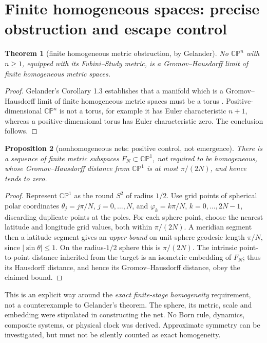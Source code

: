 \documentclass[11pt,a4paper]{article}
\newtheorem{theorem}{Theorem}
\newtheorem{proposition}[theorem]{Proposition}
\newcommand{\CP}{\mathbb{CP}}
\begin{document}
\section{Finite homogeneous spaces: precise obstruction and escape control}
\begin{theorem}[finite homogeneous metric obstruction, by Gelander]\label{thm:gel}
No \(\CP^n\) with \(n\geq1\), equipped with its Fubini--Study metric, is a Gromov--Hausdorff limit of finite \emph{homogeneous metric spaces}.
\end{theorem}
\begin{proof}
Gelander's Corollary 1.3 establishes that a manifold which is a Gromov--Hausdorff limit of finite homogeneous metric spaces must be a torus \cite{gelander}. Positive-dimensional \(\CP^n\) is not a torus, for example it has Euler characteristic \(n+1\), whereas a positive-dimensional torus has Euler characteristic zero. The conclusion follows.
\end{proof}

\begin{proposition}[nonhomogeneous nets: positive control, not emergence]\label{prop:nets}
There is a sequence of finite metric subspaces \(F_N\subset\CP^1\), not required to be homogeneous, whose Gromov--Hausdorff distance from \(\CP^1\) is at most \(\pi/(2N)\), and hence tends to zero.
\end{proposition}
\begin{proof}
Represent \(\CP^1\) as the round \(S^2\) of radius \(1/2\). Use grid points of spherical polar coordinates \(\theta_j=j\pi/N\), \(j=0,\dots,N\), and \(\varphi_k=k\pi/N\), \(k=0,\dots,2N-1\), discarding duplicate points at the poles. For each sphere point, choose the nearest latitude and longitude grid values, both within \(\pi/(2N)\). A meridian segment then a latitude segment gives an \emph{upper bound} on unit-sphere geodesic length \(\pi/N\), since \(|\sin\theta|\leq1\). On the radius-\(1/2\) sphere this is \(\pi/(2N)\). The intrinsic point-to-point distance inherited from the target is an isometric embedding of \(F_N\); thus its Hausdorff distance, and hence its Gromov--Hausdorff distance, obey the claimed bound.
\end{proof}

This is an explicit way around the \emph{exact finite-stage homogeneity} requirement, not a counterexample to Gelander's theorem. The sphere, its metric, scale and embedding were stipulated in constructing the net. No Born rule, dynamics, composite systems, or physical clock was derived. Approximate symmetry can be investigated, but must not be silently counted as exact homogeneity.
\end{document}

